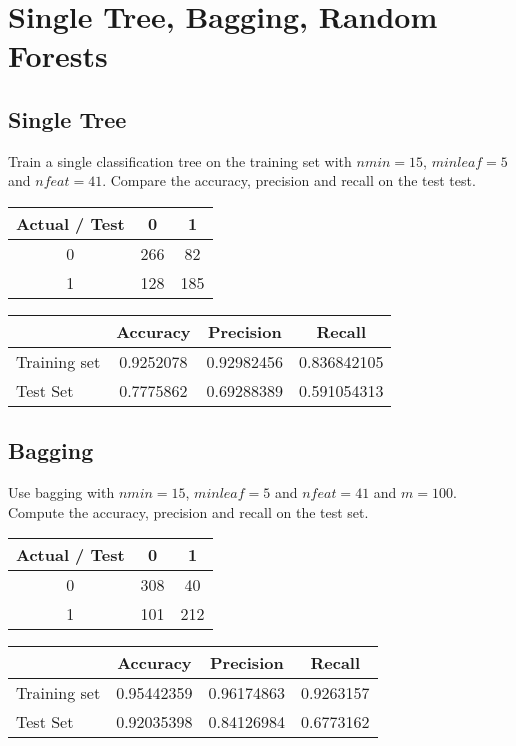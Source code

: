 \documentclass[a4paper,12pt]{article}
\begin{document}
\section{Single Tree, Bagging, Random Forests}

\subsection{Single Tree}
Train a single classification tree on the training set with $nmin=15$, $minleaf=5$ and $nfeat=41$.
 Compare the accuracy, precision and recall on the test test.
 
\begin{table}[h!]
\centering
	\begin{tabular}{c||c|c}
	Actual / Test & 0 & 1 \\ \hline \hline
	0 & 266 & 82 \\ \hline
	1 & 128 & 185
	\end{tabular}
\end{table}

\begin{table}[h!]
\centering
	\begin{tabular}{l||c|c|c}
	& Accuracy & Precision & Recall \\ \hline \hline
	Training set & 0.9252078 & 0.92982456 & 0.836842105 \\ \hline
	Test Set & 0.7775862 & 0.69288389 & 0.591054313
	\end{tabular}
\end{table}

\subsection{Bagging}
Use bagging with $nmin=15$, $minleaf=5$ and $nfeat=41$ and $m = 100$.
Compute the accuracy, precision and recall on the test set.

\begin{table}[h!]
\centering
	\begin{tabular}{c||c|c}
	Actual / Test & 0 & 1 \\ \hline \hline
	0 & 308 & 40 \\ \hline
	1 & 101 & 212
	\end{tabular}
\end{table}

\begin{table}[h!]
\centering
	\begin{tabular}{l||c|c|c}
	& Accuracy & Precision & Recall \\ \hline \hline
	Training set & 0.95442359 & 0.96174863 & 0.9263157 \\ \hline
	Test Set & 0.92035398 & 0.84126984 & 0.6773162
	\end{tabular}
\end{table}
\end{document}

